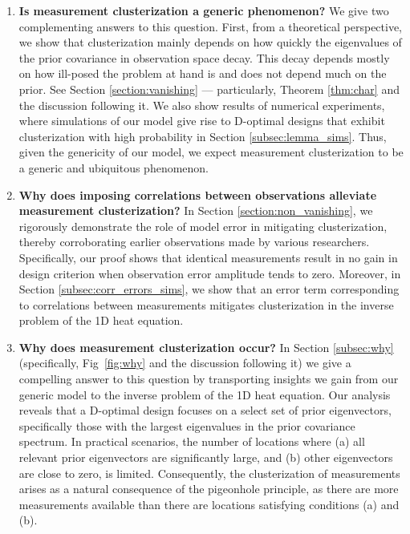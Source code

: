 \documentclass[ba]{imsart}
\theoremstyle{plain}
\theoremstyle{definition}
\theoremstyle{remark}
\begin{document}
\begin{enumerate}
\item \label{q:generic} \textbf{Is measurement clusterization a
  generic phenomenon?}
We give two complementing answers to this question. First, from a
  theoretical perspective, we show that clusterization mainly depends
  on how quickly the eigenvalues of the prior covariance in
  observation space decay. This decay depends mostly on how ill-posed
  the problem at hand is and does not depend much on the prior. See
  Section \ref{section:vanishing} --- particularly, Theorem
  \ref{thm:char} and the discussion following it. We also show results
  of numerical experiments, where simulations of our model give rise
  to D-optimal designs that exhibit clusterization with high
  probability in Section \ref{subsec:lemma_sims}. Thus, given the
  genericity of our model, we expect measurement clusterization to be
  a generic and ubiquitous phenomenon.

\item \label{q:mitigate} \textbf{Why does imposing correlations
  between observations alleviate measurement clusterization?} In
  Section \ref{section:non_vanishing}, we rigorously demonstrate the
  role of model error in mitigating clusterization, thereby
  corroborating earlier observations made by various
  researchers. Specifically, our proof shows that identical
  measurements result in no gain in design criterion when observation
  error amplitude tends to zero. Moreover, in Section
  \ref{subsec:corr_errors_sims}, we show that an error term
  corresponding to correlations between measurements mitigates
  clusterization in the inverse problem of the 1D heat equation.

\item \label{q:why} \textbf{Why does measurement clusterization
  occur?} In Section \ref{subsec:why} (specifically, Fig~\ref{fig:why}
  and the discussion following it) we give a compelling answer to this
  question by transporting insights we gain from our generic model to
  the inverse problem of the 1D heat equation. Our analysis reveals
  that a D-optimal design focuses on a select set of prior
  eigenvectors, specifically those with the largest eigenvalues in the
  prior covariance spectrum. In practical scenarios, the number of
  locations where (a) all relevant prior eigenvectors are
  significantly large, and (b) other eigenvectors are close to zero,
  is limited. Consequently, the clusterization of measurements arises
  as a natural consequence of the pigeonhole principle, as there are
  more measurements available than there are locations satisfying
  conditions (a) and (b).

\end{enumerate}
\end{document}
